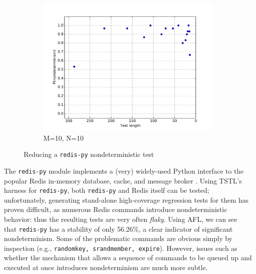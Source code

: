 {\begin{figure}
\begin{subfigure}{0.3\columnwidth}
\includegraphics[width=\columnwidth]{redisforceprep}
\caption{M=10, N=10}
\label{fig:r3}
\end{subfigure}
\caption{Reducing a {\tt redis-py} nondeterministic test}
\end{figure}

The {\tt redis-py} \cite{redispy} module implements a (very) widely-used Python interface
to the popular Redis in-memory database, cache, and
message broker \cite{redis}.  
Using TSTL's harness for {\tt redis-py}, both {\tt redis-py} and Redis
itself can be tested; unfortunately, generating stand-alone
high-coverage regression tests for them
has proven difficult, as numerous Redis commands introduce nondeterministic
behavior:  thus the resulting tests are very often \emph{flaky}.
Using AFL, we can see that {\tt redis-py} has a 
stability of only 56.26\%, a clear indicator of significant nondeterminism. Some
of the problematic commands are obvious simply by inspection (e.g.,
{\tt randomkey, srandmember, expire}). 
However, issues such as whether the mechanism that allows a
sequence of commands to be queued up and executed
at once introduces nondeterminism are much more subtle.

}
